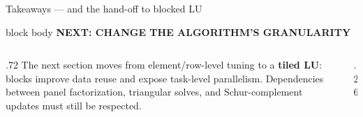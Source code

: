 \documentclass[aspectratio=169,10pt]{beamer}
\newcommand{\cardtitle}[2]{%
  {\color{#1}\bfseries\small #2}\par\vspace{.08cm}}
\begin{document}
\begin{frame}{Takeaways — and the hand-off to blocked LU}
  \vspace{.25cm}
  \begin{beamercolorbox}[rounded=true,sep=.22cm,wd=\textwidth]{block body}
    \cardtitle{lavender}{NEXT: CHANGE THE ALGORITHM'S GRANULARITY}
    \begin{columns}[T,onlytextwidth]
      \begin{column}{.72\textwidth}
        \small The next section moves from element/row-level tuning to a
        \textbf{tiled LU}: blocks improve data reuse and expose task-level
        parallelism. Dependencies between panel factorization, triangular
        solves, and Schur-complement updates must still be respected.
      \end{column}
      \begin{column}{.26\textwidth}
        \centering
      \end{column}
    \end{columns}
  \end{beamercolorbox}

  \vspace{.19cm}
\end{frame}
\end{document}
